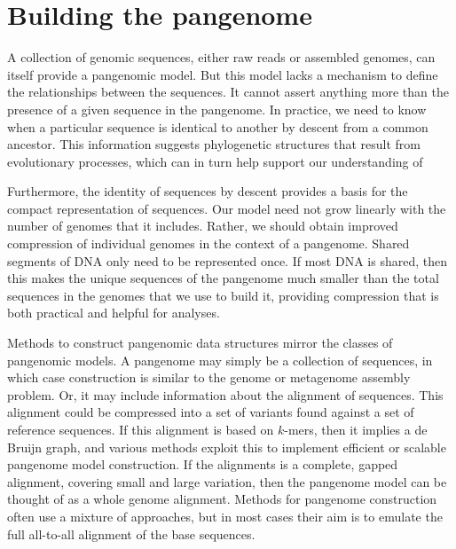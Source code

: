 \section{Building the pangenome}

A collection of genomic sequences, either raw reads or assembled genomes, can itself provide a pangenomic model.
But this model lacks a mechanism to define the relationships between the sequences.
It cannot assert anything more than the presence of a given sequence in the pangenome.
In practice, we need to know when a particular sequence is identical to another by descent from a common ancestor.
This information suggests phylogenetic structures that result from evolutionary processes, which can in turn help support our understanding of 

Furthermore, the identity of sequences by descent provides a basis for the compact representation of sequences.
Our model need not grow linearly with the number of genomes that it includes.
Rather, we should obtain improved compression of individual genomes in the context of a pangenome.
Shared segments of DNA only need to be represented once.
If most DNA is shared, then this makes the unique sequences of the pangenome much smaller than the total sequences in the genomes that we use to build it, providing compression that is both practical and helpful for analyses.

Methods to construct pangenomic data structures mirror the classes of pangenomic models.
A pangenome may simply be a collection of sequences, in which case construction is similar to the genome or metagenome assembly problem.
Or, it may include information about the alignment of sequences.
This alignment could be compressed into a set of variants found against a set of reference sequences.
If this alignment is based on $k$-mers, then it implies a de Bruijn graph, and various methods exploit this to implement efficient or scalable pangenome model construction.
If the alignments is a complete, gapped alignment, covering small and large variation, then the pangenome model can be thought of as a whole genome alignment.
Methods for pangenome construction often use a mixture of approaches, but in most cases their aim is to emulate the full all-to-all alignment of the base sequences.


